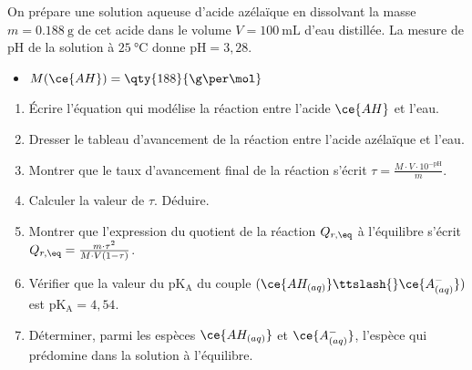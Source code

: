 On prépare une solution aqueuse d'acide azélaïque en dissolvant la masse
$m=\qty{0.188}{\g}$ de cet acide dans le volume $V=\qty{100}{\mL}$ d'eau
distillée. La mesure de $\mathrm{pH}$ de la solution à
$\qty{25}{\degreeCelsius}$ donne $\mathrm{pH}=3,28$.

\begin{donnees}
    \begin{itemize}
        \item $M(\ce{AH})=\qty{188}{\g\per\mol}$
    \end{itemize}
\end{donnees}

\begin{enumerate}
    \item Écrire l'équation qui modélise la réaction entre l'acide $\ce{AH}$ et
          l'eau.
    \item Dresser le tableau d'avancement de la réaction entre l'acide azélaïque
          et l'eau.
    \item Montrer que le taux d'avancement final de la réaction s'écrit
          $\tau=\frac{M\cdot V\cdot 10^{-\mathrm{pH}}}{m}$.
    \item Calculer la valeur de $\tau$. Déduire.
    \item Montrer que l'expression du quotient de la réaction $Q_{r,\eq}$ à
          l'équilibre s'écrit
          $Q_{r,\eq}=\frac{m\cdot\tau^{2}}{M\cdot V(1-\tau)}$.
    \item Vérifier que la valeur du $\mathrm{pK_{A}}$ du couple
          $(\ce{AH_{(aq)}}\ttslash{}\ce{A^-_{(aq)}})$ est
          $\mathrm{pK_{A}}=4,54$.
    \item Déterminer, parmi les espèces $\ce{AH_{(aq)}}$ et $\ce{A^-_{(aq)}}$,
          l'espèce qui prédomine dans la solution à l'équilibre.
\end{enumerate}

